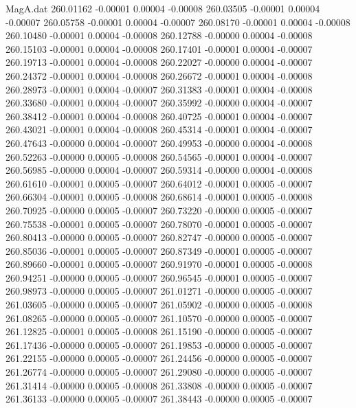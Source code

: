 \begin{filecontents}{MagA.dat}
 260.01162   -0.00001    0.00004   -0.00008
 260.03505   -0.00001    0.00004   -0.00007
 260.05758   -0.00001    0.00004   -0.00007
 260.08170   -0.00001    0.00004   -0.00008
 260.10480   -0.00001    0.00004   -0.00008
 260.12788   -0.00000    0.00004   -0.00008
 260.15103   -0.00001    0.00004   -0.00008
 260.17401   -0.00001    0.00004   -0.00007
 260.19713   -0.00001    0.00004   -0.00008
 260.22027   -0.00000    0.00004   -0.00007
 260.24372   -0.00001    0.00004   -0.00008
 260.26672   -0.00001    0.00004   -0.00008
 260.28973   -0.00001    0.00004   -0.00007
 260.31383   -0.00001    0.00004   -0.00008
 260.33680   -0.00001    0.00004   -0.00007
 260.35992   -0.00000    0.00004   -0.00007
 260.38412   -0.00001    0.00004   -0.00008
 260.40725   -0.00001    0.00004   -0.00007
 260.43021   -0.00001    0.00004   -0.00008
 260.45314   -0.00001    0.00004   -0.00007
 260.47643   -0.00000    0.00004   -0.00007
 260.49953   -0.00000    0.00004   -0.00008
 260.52263   -0.00000    0.00005   -0.00008
 260.54565   -0.00001    0.00004   -0.00007
 260.56985   -0.00000    0.00004   -0.00007
 260.59314   -0.00000    0.00004   -0.00008
 260.61610   -0.00001    0.00005   -0.00007
 260.64012   -0.00001    0.00005   -0.00007
 260.66304   -0.00001    0.00005   -0.00008
 260.68614   -0.00001    0.00005   -0.00008
 260.70925   -0.00000    0.00005   -0.00007
 260.73220   -0.00000    0.00005   -0.00007
 260.75538   -0.00001    0.00005   -0.00007
 260.78070   -0.00001    0.00005   -0.00007
 260.80413   -0.00000    0.00005   -0.00007
 260.82747   -0.00000    0.00005   -0.00007
 260.85036   -0.00001    0.00005   -0.00007
 260.87349   -0.00001    0.00005   -0.00007
 260.89660   -0.00001    0.00005   -0.00007
 260.91970   -0.00001    0.00005   -0.00008
 260.94251   -0.00000    0.00005   -0.00007
 260.96545   -0.00001    0.00005   -0.00007
 260.98973   -0.00000    0.00005   -0.00007
 261.01271   -0.00000    0.00005   -0.00007
 261.03605   -0.00000    0.00005   -0.00007
 261.05902   -0.00000    0.00005   -0.00008
 261.08265   -0.00000    0.00005   -0.00007
 261.10570   -0.00000    0.00005   -0.00007
 261.12825   -0.00001    0.00005   -0.00008
 261.15190   -0.00000    0.00005   -0.00007
 261.17436   -0.00000    0.00005   -0.00007
 261.19853   -0.00000    0.00005   -0.00007
 261.22155   -0.00000    0.00005   -0.00007
 261.24456   -0.00000    0.00005   -0.00007
 261.26774   -0.00000    0.00005   -0.00007
 261.29080   -0.00000    0.00005   -0.00007
 261.31414   -0.00000    0.00005   -0.00008
 261.33808   -0.00000    0.00005   -0.00007
 261.36133   -0.00000    0.00005   -0.00007
 261.38443   -0.00000    0.00005   -0.00007

\end{filecontents}
